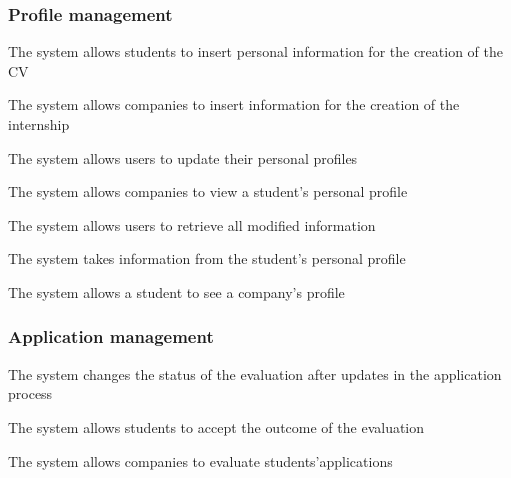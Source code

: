 \subsubsection*{Profile management}
\begin{enumerate}[label={\textbf{[R\arabic*]}}, leftmargin=1.35cm]
    \setcounter{enumi}{2}
    \item The system allows students to insert personal information for the creation of the CV
    \item The system allows companies to insert information for the creation of the internship
    \item The system allows users to update their personal profiles
    \item The system allows companies to view a student's personal profile
    \item The system allows users to retrieve all modified information
    \item The system takes information from the student's personal profile
    \item The system allows a student to see a company’s profile
\end{enumerate}

\subsubsection*{Application management}
\begin{enumerate}[label={\textbf{[R\arabic*]}}, leftmargin=1.35cm]
    \setcounter{enumi}{9}
    \item The system changes the status of the evaluation after updates in the application process
    \item The system allows students to accept the outcome of the evaluation
    \item The system allows companies to evaluate students'applications
\end{enumerate}

